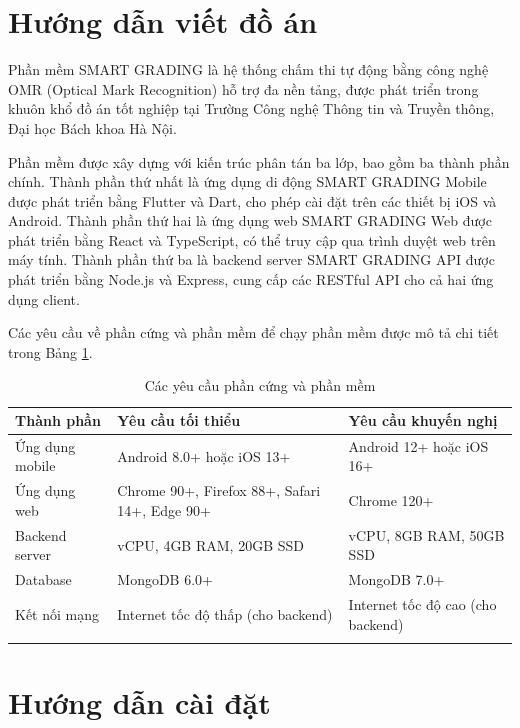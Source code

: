 \documentclass[../DoAn.tex]{subfiles}
\begin{document}
\section{Hướng dẫn viết đồ án}
\label{section:7.1}

Phần mềm SMART GRADING là hệ thống chấm thi tự động bằng công nghệ OMR (Optical Mark Recognition) hỗ trợ đa nền tảng, được phát triển trong khuôn khổ đồ án tốt nghiệp tại Trường Công nghệ Thông tin và Truyền thông, Đại học Bách khoa Hà Nội.

Phần mềm được xây dựng với kiến trúc phân tán ba lớp, bao gồm ba thành phần chính. Thành phần thứ nhất là ứng dụng di động SMART GRADING Mobile được phát triển bằng Flutter và Dart, cho phép cài đặt trên các thiết bị iOS và Android. Thành phần thứ hai là ứng dụng web SMART GRADING Web được phát triển bằng React và TypeScript, có thể truy cập qua trình duyệt web trên máy tính. Thành phần thứ ba là backend server SMART GRADING API được phát triển bằng Node.js và Express, cung cấp các RESTful API cho cả hai ứng dụng client.

Các yêu cầu về phần cứng và phần mềm để chạy phần mềm được mô tả chi tiết trong Bảng \ref{tab:phan-mem-yeu-cau}.

{\setlength{\tabcolsep}{1pt}
\begin{longtable}{|>{\raggedright\arraybackslash}p{4cm}|>{\raggedright\arraybackslash}p{5cm}|>{\raggedright\arraybackslash}p{6cm}|}
\hline
\textbf{Thành phần} & \textbf{Yêu cầu tối thiểu} & \textbf{Yêu cầu khuyến nghị} \\ \hline
\endhead
\hline
\endfoot
\endlastfoot
Ứng dụng mobile & Android 8.0+ hoặc iOS 13+ & Android 12+ hoặc iOS 16+ \\ \hline
Ứng dụng web & Chrome 90+, Firefox 88+, Safari 14+, Edge 90+ & Chrome 120+ \\ \hline
Backend server & 2 vCPU, 4GB RAM, 20GB SSD & 4 vCPU, 8GB RAM, 50GB SSD \\ \hline
Database & MongoDB 6.0+ & MongoDB 7.0+ \\ \hline
Kết nối mạng & Internet tốc độ thấp (cho backend) & Internet tốc độ cao (cho backend) \\ \hline
\caption{Các yêu cầu phần cứng và phần mềm}
\label{tab:phan-mem-yeu-cau}
\end{longtable}}

\section{Hướng dẫn cài đặt}
\label{section:7.2}
\end{document}
